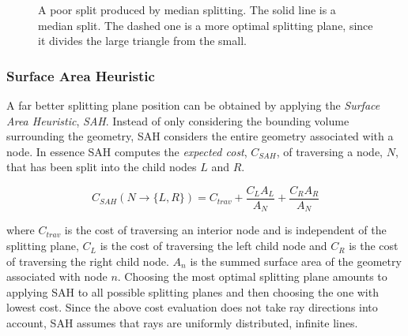 \begin{figure}
  \centering

  \vspace{3mm}
  \parbox{5cm}{\caption[A poor split produced by median splitting.]{A poor split
      produced by median splitting. The solid line is a median split. The dashed
      one is a more optimal splitting plane, since it divides the large triangle
      from the small.}\label{fig:crapMedian}}
\end{figure}

\subsubsection{Surface Area Heuristic}\label{sec:SAH}


A far better splitting plane position can be obtained by applying the
\textit{Surface Area Heuristic}, \textit{SAH}. Instead of only considering the
bounding volume surrounding the geometry, SAH considers the entire geometry
associated with a node. In essence SAH computes the \textit{expected cost},
$C_{SAH}$, of traversing a node, $N$, that has been split into the child nodes
$L$ and $R$.

\begin{displaymath}
  C_{SAH}(N \rightarrow \{L, R\}) = C_{trav} + \frac{C_L A_L}{A_N} +
  \frac{C_R A_R}{A_N}
\end{displaymath}

where $C_{trav}$ is the cost of traversing an interior node and is independent
of the splitting plane, $C_L$ is the cost of traversing the left child node and
$C_R$ is the cost of traversing the right child node. $A_n$ is the summed
surface area of the geometry associated with node $n$. Choosing the most optimal
splitting plane amounts to applying SAH to all possible splitting planes and
then choosing the one with lowest cost. Since the above cost evaluation does not
take ray directions into account, SAH assumes that rays are uniformly
distributed, infinite lines.

